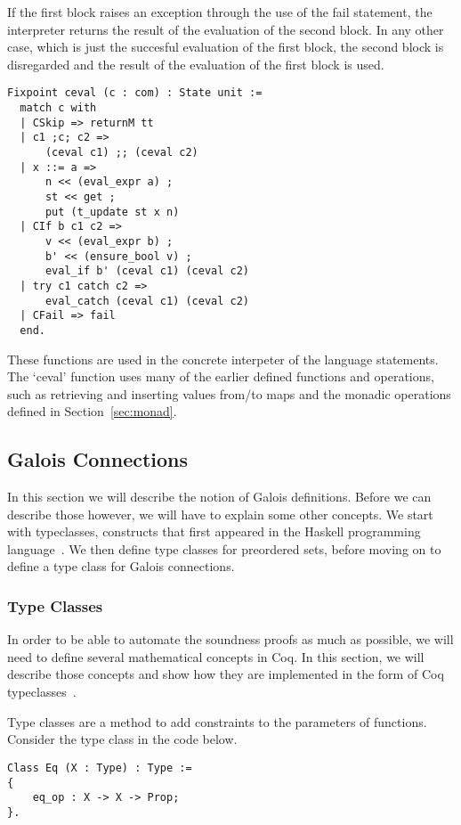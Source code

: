 If the first block raises an exception through the use of the fail statement,
the interpreter returns the result of the evaluation of the second block. In
any other case, which is just the succesful evaluation of the first block, the
second block is disregarded and the result of the evaluation of the first block
is used.

\begin{verbatim}
Fixpoint ceval (c : com) : State unit :=
  match c with
  | CSkip => returnM tt
  | c1 ;c; c2 => 
      (ceval c1) ;; (ceval c2)
  | x ::= a => 
      n << (eval_expr a) ;
      st << get ;
      put (t_update st x n)
  | CIf b c1 c2 => 
      v << (eval_expr b) ;
      b' << (ensure_bool v) ;
      eval_if b' (ceval c1) (ceval c2)
  | try c1 catch c2 =>
   	  eval_catch (ceval c1) (ceval c2)
  | CFail => fail
  end.
\end{verbatim}

These functions are used in the concrete interpeter of the language statements.
The `ceval' function uses many of the earlier defined functions and operations,
such as retrieving and inserting values from/to maps and the monadic operations
defined in Section~\ref{sec:monad}.

\subsection{Galois Connections}
In this section we will describe the notion of Galois definitions. Before we
can describe those however, we will have to explain some other concepts. We
start with typeclasses, constructs that first appeared in the Haskell
programming language~\cite{wadler1989make}. We then define type classes for
preordered sets, before moving on to define a type class for Galois
connections.

\subsubsection{Type Classes}
In order to be able to automate the soundness proofs as much as possible, we
will need to define several mathematical concepts in Coq. In this section, we
will describe those concepts and show how they are implemented in the form of
Coq typeclasses~\cite{sozeau2008first}. 

Type classes are a method to add constraints to the parameters of functions.
Consider the type class  in the code below.

\begin{verbatim}
Class Eq (X : Type) : Type :=
{
	eq_op : X -> X -> Prop;
}.
\end{verbatim}

